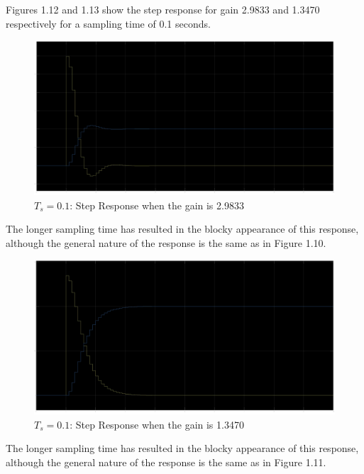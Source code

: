 \documentclass[stu, a4paper, 12pt, floatsintext]{apa7}
\numberwithin{figure}{section}
\numberwithin{table}{section}
\numberwithin{equation}{section}
\begin{document}
Figures 1.12 and 1.13 show the step response for gain 2.9833 and 1.3470 respectively for a sampling time of 0.1 seconds.
\begin{figure}[H]
    \caption{$T_s = 0.1$: Step Response when the gain is 2.9833}
    \label{fig:0.1_Ts_step_response_1}
    \centering
    \includegraphics[width=1.1\textwidth]{pictures/task2_0.1_step_response_1.jpg}
\end{figure}
The longer sampling time has resulted in the blocky appearance of this response, although the general nature of the response is the same as in Figure 1.10.
\begin{figure}[H]
    \caption{$T_s = 0.1$: Step Response when the gain is 1.3470}
    \label{fig:0.1_Ts_step_response_2}
    \centering
    \includegraphics[width=1.1\textwidth]{pictures/task2_0.1_step_response_2.jpg}
\end{figure}
The longer sampling time has resulted in the blocky appearance of this response, although the general nature of the response is the same as in Figure 1.11.
\end{document}
